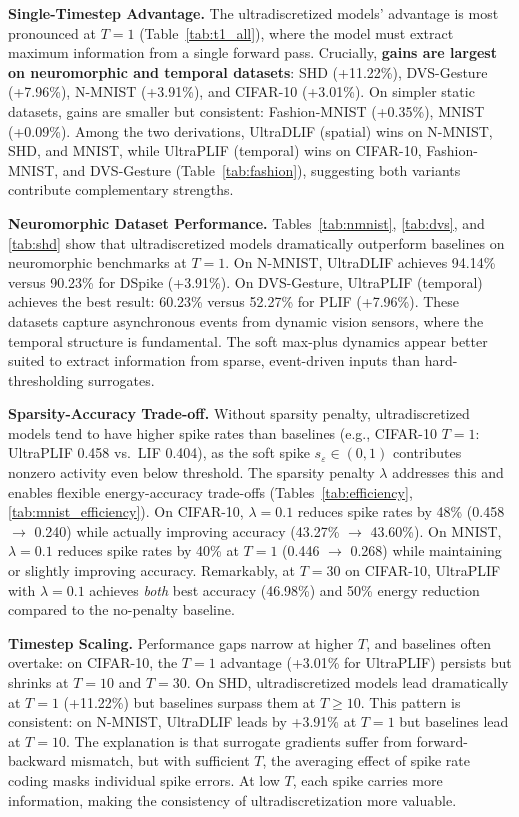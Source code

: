 \documentclass{article}
\theoremstyle{plain}
\theoremstyle{definition}
\theoremstyle{remark}
\newcommand{\eps}{\varepsilon}
\begin{document}
\textbf{Single-Timestep Advantage.} The ultradiscretized models' advantage is most pronounced at $T{=}1$ (Table~\ref{tab:t1_all}), where the model must extract maximum information from a single forward pass. Crucially, \textbf{gains are largest on neuromorphic and temporal datasets}: SHD (+11.22\%), DVS-Gesture (+7.96\%), N-MNIST (+3.91\%), and CIFAR-10 (+3.01\%). On simpler static datasets, gains are smaller but consistent: Fashion-MNIST (+0.35\%), MNIST (+0.09\%). Among the two derivations, UltraDLIF (spatial) wins on N-MNIST, SHD, and MNIST, while UltraPLIF (temporal) wins on CIFAR-10, Fashion-MNIST, and DVS-Gesture (Table~\ref{tab:fashion}), suggesting both variants contribute complementary strengths.

\textbf{Neuromorphic Dataset Performance.} Tables~\ref{tab:nmnist}, \ref{tab:dvs}, and \ref{tab:shd} show that ultradiscretized models dramatically outperform baselines on neuromorphic benchmarks at $T{=}1$. On N-MNIST, UltraDLIF achieves 94.14\% versus 90.23\% for DSpike (+3.91\%). On DVS-Gesture, UltraPLIF (temporal) achieves the best result: 60.23\% versus 52.27\% for PLIF (+7.96\%). These datasets capture asynchronous events from dynamic vision sensors, where the temporal structure is fundamental. The soft max-plus dynamics appear better suited to extract information from sparse, event-driven inputs than hard-thresholding surrogates.

\textbf{Sparsity-Accuracy Trade-off.} Without sparsity penalty, ultradiscretized models tend to have higher spike rates than baselines (e.g., CIFAR-10 $T{=}1$: UltraPLIF 0.458 vs.\ LIF 0.404), as the soft spike $s_\eps \in (0,1)$ contributes nonzero activity even below threshold. The sparsity penalty $\lambda$ addresses this and enables flexible energy-accuracy trade-offs (Tables~\ref{tab:efficiency}, \ref{tab:mnist_efficiency}). On CIFAR-10, $\lambda{=}0.1$ reduces spike rates by 48\% (0.458 $\to$ 0.240) while actually improving accuracy (43.27\% $\to$ 43.60\%). On MNIST, $\lambda{=}0.1$ reduces spike rates by 40\% at $T{=}1$ (0.446 $\to$ 0.268) while maintaining or slightly improving accuracy. Remarkably, at $T{=}30$ on CIFAR-10, UltraPLIF with $\lambda{=}0.1$ achieves \emph{both} best accuracy (46.98\%) and 50\% energy reduction compared to the no-penalty baseline.

\textbf{Timestep Scaling.} Performance gaps narrow at higher $T$, and baselines often overtake: on CIFAR-10, the $T{=}1$ advantage (+3.01\% for UltraPLIF) persists but shrinks at $T{=}10$ and $T{=}30$. On SHD, ultradiscretized models lead dramatically at $T{=}1$ (+11.22\%) but baselines surpass them at $T{\geq}10$. This pattern is consistent: on N-MNIST, UltraDLIF leads by +3.91\% at $T{=}1$ but baselines lead at $T{=}10$. The explanation is that surrogate gradients suffer from forward-backward mismatch, but with sufficient $T$, the averaging effect of spike rate coding masks individual spike errors. At low $T$, each spike carries more information, making the consistency of ultradiscretization more valuable.
\end{document}
